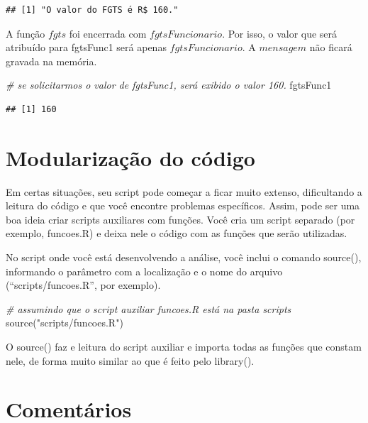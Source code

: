 \documentclass[
]{book}
\newenvironment{Shaded}{\begin{snugshade}}{\end{snugshade}}
\newcommand{\CommentTok}[1]{\textcolor[rgb]{0.56,0.35,0.01}{\textit{#1}}}
\newcommand{\FunctionTok}[1]{\textcolor[rgb]{0.00,0.00,0.00}{#1}}
\newcommand{\NormalTok}[1]{#1}
\newcommand{\StringTok}[1]{\textcolor[rgb]{0.31,0.60,0.02}{#1}}
\begin{document}
\begin{verbatim}
## [1] "O valor do FGTS é R$ 160."
\end{verbatim}

A função \(fgts\) foi encerrada com \(fgtsFuncionario\). Por isso, o valor que será atribuído para fgtsFunc1 será apenas \(fgtsFuncionario\). A \(mensagem\) não ficará gravada na memória.

\begin{Shaded}
\begin{Highlighting}[]
\CommentTok{\# se solicitarmos o valor de fgtsFunc1, será exibido o valor 160.}
\NormalTok{fgtsFunc1}
\end{Highlighting}
\end{Shaded}

\begin{verbatim}
## [1] 160
\end{verbatim}

\hypertarget{modularizauxe7uxe3o-do-cuxf3digo}{%
\section{Modularização do código}\label{modularizauxe7uxe3o-do-cuxf3digo}}

Em certas situações, seu script pode começar a ficar muito extenso, dificultando a leitura do código e que você encontre problemas específicos. Assim, pode ser uma boa ideia criar scripts auxiliares com funções. Você cria um script separado (por exemplo, funcoes.R) e deixa nele o código com as funções que serão utilizadas.

No script onde você está desenvolvendo a análise, você inclui o comando source(), informando o parâmetro com a localização e o nome do arquivo (``scripts/funcoes.R'', por exemplo).

\begin{Shaded}
\begin{Highlighting}[]
\CommentTok{\# assumindo que o script auxiliar funcoes.R está na pasta scripts}
\FunctionTok{source}\NormalTok{(}\StringTok{"scripts/funcoes.R"}\NormalTok{)}
\end{Highlighting}
\end{Shaded}

O source() faz e leitura do script auxiliar e importa todas as funções que constam nele, de forma muito similar ao que é feito pelo library().

\hypertarget{comentuxe1rios}{%
\section{Comentários}\label{comentuxe1rios}}
\end{document}
